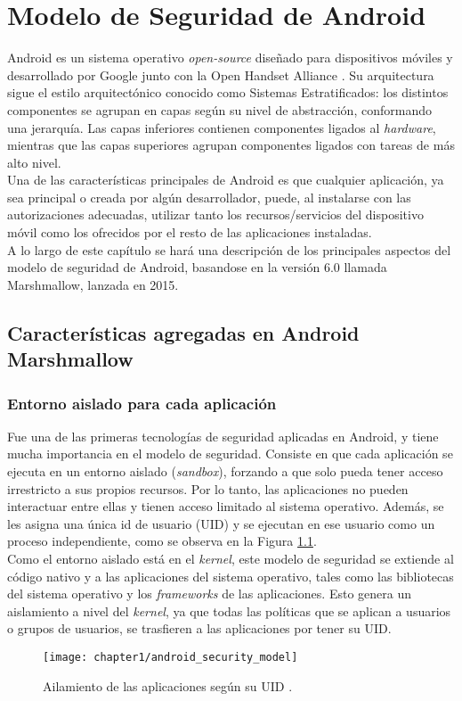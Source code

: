 \chapter{Modelo de Seguridad de Android}
Android \cite{aos} es un sistema operativo \textit{open-source} \cite{aosp} diseñado para dispositivos móviles y
desarrollado por Google junto con la Open Handset Alliance \cite{oha}. Su arquitectura sigue el estilo arquitect\'onico conocido como Sistemas Estratificados: los distintos componentes se agrupan en capas seg\'un su nivel de abstracci\'on, conformando una jerarqu\'ia. Las capas inferiores contienen componentes ligados al \textit{hardware}, mientras que las capas superiores agrupan componentes ligados con tareas de m\'as alto nivel.\\
Una de las características principales de Android es que cualquier aplicación, ya sea principal o
creada por algún desarrollador, puede, al instalarse con las autorizaciones adecuadas, utilizar tanto
los recursos/servicios del dispositivo móvil como los ofrecidos por el resto de las aplicaciones
instaladas.\\
A lo largo de este cap\'itulo se har\'a una descripci\'on de los principales aspectos del modelo de seguridad de Android, basandose en la versi\'on 6.0 llamada Marshmallow, lanzada en 2015.
\section{Características agregadas en Android Marshmallow}
\subsection{Entorno aislado para cada aplicaci\'on}\label{ch01-sandbox}
Fue una de las primeras tecnologías de seguridad aplicadas en Android, y tiene mucha importancia en el modelo de seguridad. Consiste en que cada aplicaci\'on se ejecuta en un entorno aislado (\textit{sandbox}), forzando a que solo pueda tener acceso irrestricto a sus propios recursos. Por lo tanto, las aplicaciones no pueden interactuar entre ellas y tienen acceso limitado al sistema operativo. Adem\'as, se les asigna una única id de usuario (UID) y se ejecutan en ese usuario como un proceso independiente, como se observa en la Figura \ref{fig:ch01:sandbox}.\\
Como el entorno aislado está en el \textit{kernel}, este modelo de seguridad se extiende al código nativo y a las aplicaciones del sistema operativo, tales como las bibliotecas del sistema operativo y los \textit{frameworks} de las aplicaciones. Esto genera un aislamiento a nivel del \textit{kernel}, ya que todas las políticas que se aplican a usuarios o grupos de usuarios, se trasfieren a las aplicaciones por tener su UID.
\begin{figure}[!hb]
	\begin{center}
		\texttt{[image: chapter1/android\_security\_model]}
	    \caption{Ailamiento de las aplicaciones seg\'un su UID \cite{asreview2015}.}
	    \label{fig:ch01:sandbox}
    \end{center}
\end{figure}
